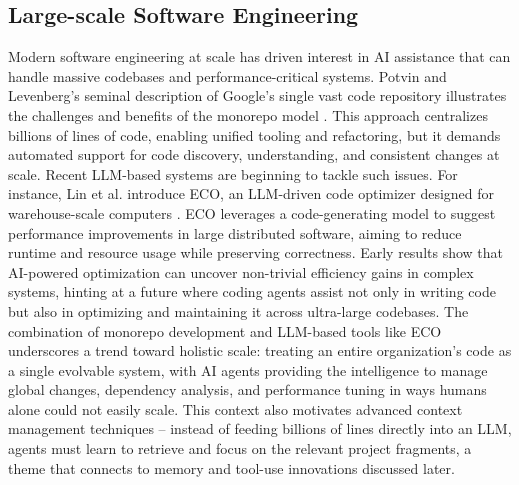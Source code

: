 \subsection{Large-scale Software Engineering}
Modern software engineering at scale has driven interest in AI assistance that can handle massive codebases and performance-critical systems. Potvin and Levenberg’s seminal description of Google’s single vast code repository illustrates the challenges and benefits of the monorepo model \citep{potvin2016google}. This approach centralizes billions of lines of code, enabling unified tooling and refactoring, but it demands automated support for code discovery, understanding, and consistent changes at scale. Recent LLM-based systems are beginning to tackle such issues. For instance, Lin et al. introduce ECO, an LLM-driven code optimizer designed for warehouse-scale computers \citep{lin2025eco}. ECO leverages a code-generating model to suggest performance improvements in large distributed software, aiming to reduce runtime and resource usage while preserving correctness. Early results show that AI-powered optimization can uncover non-trivial efficiency gains in complex systems, hinting at a future where coding agents assist not only in writing code but also in optimizing and maintaining it across ultra-large codebases. The combination of monorepo development and LLM-based tools like ECO underscores a trend toward holistic scale: treating an entire organization’s code as a single evolvable system, with AI agents providing the intelligence to manage global changes, dependency analysis, and performance tuning in ways humans alone could not easily scale. This context also motivates advanced context management techniques – instead of feeding billions of lines directly into an LLM, agents must learn to retrieve and focus on the relevant project fragments, a theme that connects to memory and tool-use innovations discussed later.

